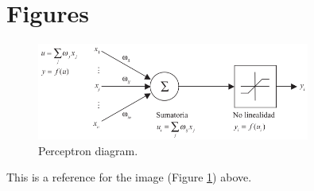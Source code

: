 \documentclass{article} %
\begin{document}
\section{Figures}

\begin{figure}[H]
    \centering
    \includegraphics[width=0.8\textwidth]{images/perceptron-graph}
    \caption{Perceptron diagram.}
    \label{fig:perceptron-graph}
\end{figure}

This is a reference for the image (Figure \ref{fig:perceptron-graph}) above.
\end{document}
